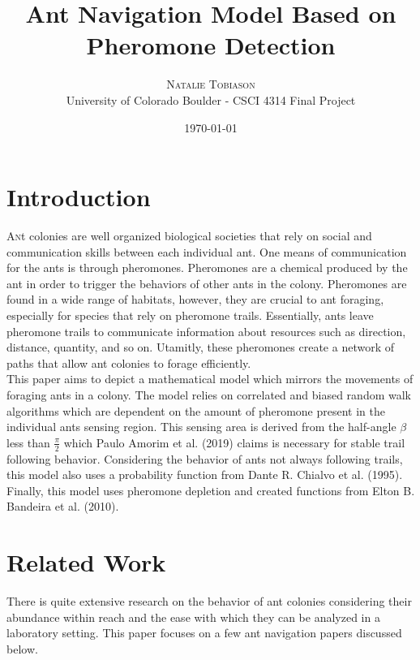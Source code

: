 \documentclass[twoside,twocolumn]{article}
\title{Ant Navigation Model Based on Pheromone Detection} %
\author{%
\textsc{Natalie Tobiason} \\[1ex] %
\normalsize University of Colorado Boulder - CSCI 4314 Final Project\\ %
}
\date{\today} %
\begin{document}
\maketitle


\section{Introduction}

\lettrine[nindent=0em,lines=3]{A} nt colonies are well organized biological societies that rely on social and communication skills between each individual ant. One means of communication for the ants is through pheromones. Pheromones are a chemical produced by the ant in order to trigger the behaviors of other ants in the colony. Pheromones are found in a wide range of habitats, however, they are crucial to ant foraging, especially for species that rely on pheromone trails. Essentially, ants leave pheromone trails to communicate information about resources such as direction, distance, quantity, and so on. Utamitly, these pheromones create a network of paths that allow ant colonies to forage efficiently. \\
This paper aims to depict a mathematical model which mirrors the movements of foraging ants in a colony. The model relies on correlated and biased random walk algorithms which are dependent on the amount of pheromone present in the individual ants sensing region. This sensing area is derived from the half-angle $\beta$ less than $\frac{\pi}{2}$ which Paulo Amorim et al. (2019) claims is necessary for stable trail following behavior. Considering the behavior of ants not always following trails, this model also uses a probability function from Dante R. Chialvo et al. (1995). Finally, this model uses pheromone depletion and created functions from Elton B. Bandeira et al. (2010).



\section{Related Work}

There is quite extensive research on the behavior of ant colonies considering their abundance within reach and the ease with which they can be analyzed in a laboratory setting. This paper focuses on a few ant navigation papers discussed below. 
\end{document}
